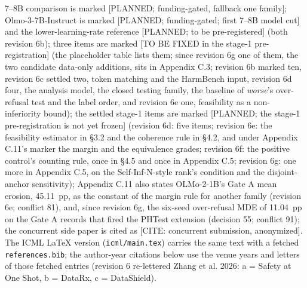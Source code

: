 \documentclass{article}
\theoremstyle{plain}
\theoremstyle{definition}
\theoremstyle{remark}
\begin{document}
7--8B comparison is marked [PLANNED; funding-gated, fallback one family];
Olmo-3-7B-Instruct is marked [PLANNED; funding-gated; first 7--8B model cut] and
the lower-learning-rate reference [PLANNED; to be pre-registered] (both revision
6b); three items are marked [TO BE FIXED in the stage-1 pre-registration] (the
placeholder table lists them; since revision 6g one of them, the two candidate
data-only additions, sits in Appendix C.3; revision 6b marked ten, revision 6c
settled two, token matching and the HarmBench input, revision 6d four, the
analysis model, the closed testing family, the baseline of \emph{worse}'s
over-refusal test and the label order, and revision 6e one, feasibility as a
non-inferiority bound); the settled stage-1 items are marked [PLANNED; the
stage-1 pre-registration is not yet frozen] (revision 6d: five items; revision
6e: the feasibility estimator in \S{}3.2 and the coherence rule in \S{}4.2, and
under Appendix C.11's marker the margin and the equivalence grades; revision 6f:
the positive control's counting rule, once in \S{}4.5 and once in Appendix C.5;
revision 6g: one more in Appendix C.5, on the Self-Inf-N-style rank's condition
and the disjoint-anchor sensitivity); Appendix C.11 also states OLMo-2-1B's Gate
A mean erosion, 45.11~pp, as the constant of the margin rule for another family
(revision 6e; conflict 81), and, since revision 6g, the six-seed over-refusal
MDE of 11.04~pp on the Gate A records that fired the PHTest extension (decision
55; conflict 91); the concurrent side paper is cited as [CITE: concurrent
submission, anonymized]. The ICML LaTeX version (\nolinkurl{icml/main.tex})
carries the same text with a fetched \nolinkurl{references.bib}; the author-year
citations below use the venue years and letters of those fetched entries
(revision 6 re-lettered Zhang et al. 2026: a = Safety at One Shot, b = DataRx, c
= DataShield).
\end{document}
